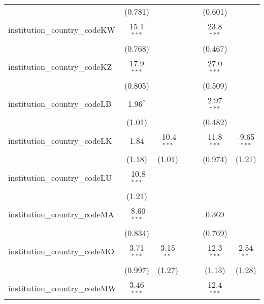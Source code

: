 \begin{tabular}{lcccccc}
                                         & (0.781)        &               &               &            & (0.601)       &   \\   
   institution\_country\_codeKW          & 15.1$^{***}$   &               &               &            & 23.8$^{***}$  &   \\   
                                         & (0.768)        &               &               &            & (0.467)       &   \\   
   institution\_country\_codeKZ          & 17.9$^{***}$   &               &               &            & 27.0$^{***}$  &   \\   
                                         & (0.805)        &               &               &            & (0.509)       &   \\   
   institution\_country\_codeLB          & 1.96$^{*}$     &               &               &            & 2.97$^{***}$  &   \\   
                                         & (1.01)         &               &               &            & (0.482)       &   \\   
   institution\_country\_codeLK          & 1.84           & -10.4$^{***}$ &               &            & 11.8$^{***}$  & -9.65$^{***}$\\   
                                         & (1.18)         & (1.01)        &               &            & (0.974)       & (1.21)\\   
   institution\_country\_codeLU          & -10.8$^{***}$  &               &               &            &               &   \\   
                                         & (1.21)         &               &               &            &               &   \\   
   institution\_country\_codeMA          & -8.60$^{***}$  &               &               &            & 0.369         &   \\   
                                         & (0.834)        &               &               &            & (0.769)       &   \\   
   institution\_country\_codeMO          & 3.71$^{***}$   & 3.15$^{**}$   &               &            & 12.3$^{***}$  & 2.54$^{**}$\\   
                                         & (0.997)        & (1.27)        &               &            & (1.13)        & (1.28)\\   
   institution\_country\_codeMW          & 3.46$^{***}$   &               &               &            & 12.4$^{***}$  &   \\   

\end{tabular}
